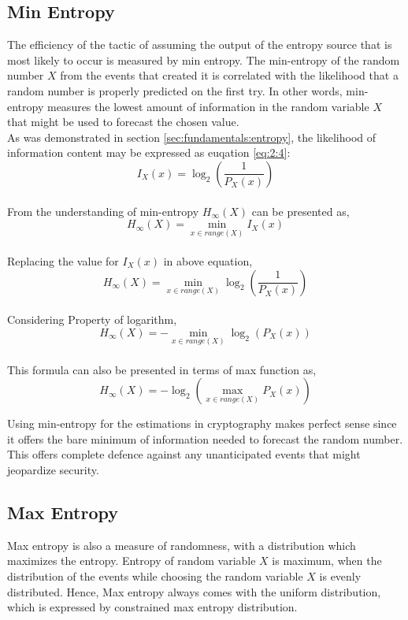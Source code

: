 %
%
\subsection{Min Entropy}
\label{subsec:fundamentals:types:min}
The efficiency of the tactic of assuming the output of the entropy source that is most likely to occur is measured by min entropy. The min-entropy of the random number $X$ from the events that created it is correlated with the likelihood that a random number is properly predicted on the first try. In other words, min-entropy measures the lowest amount of information in the random variable $X$ that might be used to forecast the chosen value.\\
As was demonstrated in section \ref{sec:fundamentals:entropy}, the likelihood of information content may be expressed as euqation \ref{eq:2:4}: 
\begin{equation*}
I_{X}(x) = \log_{2}\left(\frac{1}{P_{X}(x)}\right)
\end{equation*}\\
From the understanding of min-entropy $H_{\infty}(X)$ can be presented as,
\begin{equation*}
	H_{\infty}(X) = \min_{x \in range(X)} I_{X}(x)
\end{equation*}\\
Replacing the value for $I_{X}(x)$ in above equation,
\begin{equation*}
	H_{\infty}(X) = \min_{x \in range(X)} \log_{2}\left(\frac{1}{P_{X}(x)}\right)
\end{equation*}\\
Considering Property of logarithm,
\begin{equation}\label{eq:2:7}
H_{\infty}(X) = {-}\min_{x \in range(X)} \log_{2}\left(P_{X}(x)\right)
\end{equation}\\
This formula can also be presented in terms of max function as,
\begin{equation}\label{eq:2:8}
H_{\infty}(X) = {-}\log_{2}\left(\max_{x \in range(X)} P_{X}(x)\right)
\end{equation}

Using min-entropy for the estimations in cryptography makes perfect sense since it offers the bare minimum of information needed to forecast the random number. This offers complete defence against any unanticipated events that might jeopardize security.

%
%
\subsection{Max Entropy}
\label{subsec:fundamentals:types:max}
Max entropy is also a measure of randomness, with a distribution which maximizes the entropy. Entropy of random variable $X$ is maximum, when the distribution of the events while choosing the random variable $X$ is evenly distributed. Hence, Max entropy always comes with the uniform distribution, which is expressed by constrained max entropy distribution. 

